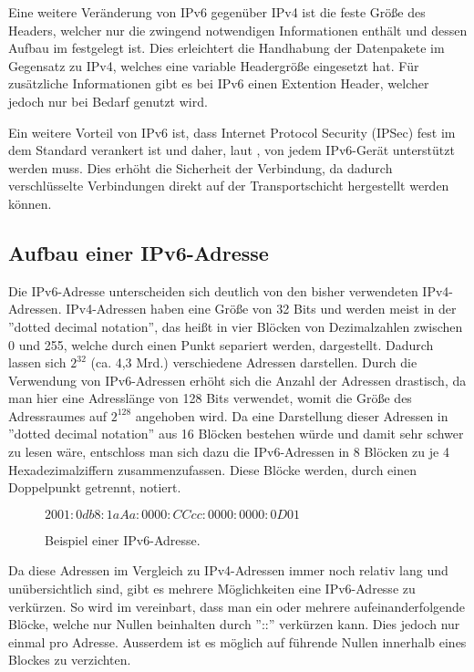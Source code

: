 \documentclass[a4paper, 12pt]{scrartcl}
\begin{document}
Eine weitere Veränderung von IPv6 gegenüber IPv4 ist die feste Größe des Headers, welcher nur die zwingend notwendigen Informationen enthält und dessen Aufbau im \cite{rfc2460} festgelegt ist. 
Dies erleichtert die Handhabung der Datenpakete im Gegensatz zu IPv4, welches eine variable Headergröße eingesetzt hat.
Für zusätzliche Informationen gibt es bei IPv6 einen Extention Header, welcher jedoch nur bei Bedarf genutzt wird.

Ein weitere Vorteil von IPv6 ist, dass Internet Protocol Security (IPSec) fest im dem Standard verankert ist und daher, laut \cite{rfc4294}, von jedem IPv6-Gerät unterstützt werden muss. Dies erhöht die Sicherheit der Verbindung, da dadurch verschlüsselte Verbindungen direkt auf der Transportschicht hergestellt werden können.

\subsection{Aufbau einer IPv6-Adresse}
Die IPv6-Adresse unterscheiden sich deutlich von den bisher verwendeten IPv4-Adressen. IPv4-Adressen haben eine Größe von 32 Bits und werden meist in der ''dotted decimal notation'', das heißt in vier Blöcken von Dezimalzahlen zwischen 0 und 255, welche durch einen Punkt separiert werden, dargestellt. Dadurch lassen sich $2^{32}$ (ca. 4,3 Mrd.) verschiedene Adressen darstellen.
Durch die Verwendung von IPv6-Adressen erhöht sich die Anzahl der Adressen drastisch, da man hier eine Adresslänge von 128 Bits verwendet, womit die Größe des Adressraumes auf $2^{128}$ angehoben wird. Da eine Darstellung dieser Adressen in ''dotted decimal notation'' aus 16 Blöcken bestehen würde und damit sehr schwer zu lesen wäre, entschloss man sich dazu die IPv6-Adressen in 8 Blöcken zu je 4 Hexadezimalziffern zusammenzufassen. Diese Blöcke werden, durch einen Doppelpunkt getrennt, notiert.


\begin{figure}[h]
	\centering
	$2001:0db8:1aAa:0000:CCcc:0000:0000:0D01$
	\caption{Beispiel einer IPv6-Adresse.}
\end{figure}


Da diese Adressen im Vergleich zu IPv4-Adressen immer noch relativ lang und unübersichtlich sind, gibt es mehrere Möglichkeiten eine IPv6-Adresse zu verkürzen.
So wird im \cite{rfc4291} vereinbart, dass man ein oder mehrere aufeinanderfolgende Blöcke, welche nur Nullen beinhalten durch ''::'' verkürzen kann. Dies jedoch nur einmal pro Adresse.
Ausserdem ist es möglich auf führende Nullen innerhalb eines Blockes zu verzichten. \\
\end{document}
